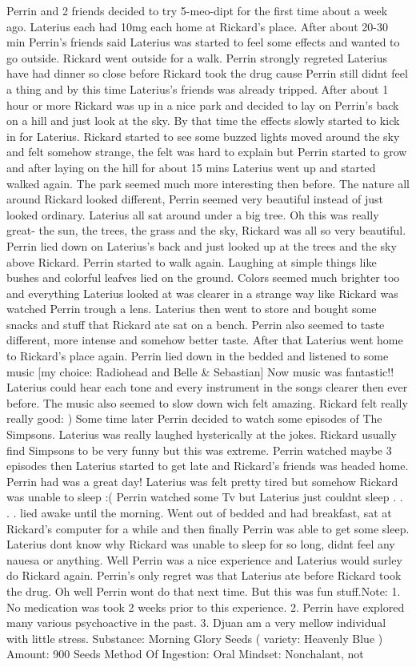 \documentclass[12pt]{book}
\begin{document}
Perrin and 2 friends decided to try 5-meo-dipt for the first time about a week ago. Laterius each had 10mg each home at Rickard's place. After about 20-30 min Perrin's friends said Laterius was started to feel some effects and wanted to go outside. Rickard went outside for a walk. Perrin strongly regreted Laterius have had dinner so close before Rickard took the drug cause Perrin still didnt feel a thing and by this time Laterius's friends was already tripped. After about 1 hour or more Rickard was up in a nice park and decided to lay on Perrin's back on a hill and just look at the sky. By that time the effects slowly started to kick in for Laterius. Rickard started to see some buzzed lights moved around the sky and felt somehow strange, the felt was hard to explain but Perrin started to grow and after laying on the hill for about 15 mins Laterius went up and started walked again. The park seemed much more interesting then before. The nature all around Rickard looked different, Perrin seemed very beautiful instead of just looked ordinary. Laterius all sat around under a big tree. Oh this was really great- the sun, the trees, the grass and the sky, Rickard was all so very beautiful. Perrin lied down on Laterius's back and just looked up at the trees and the sky above Rickard. Perrin started to walk again. Laughing at simple things like bushes and colorful leafves lied on the ground. Colors seemed much brighter too and everything Laterius looked at was clearer in a strange way like Rickard was watched Perrin trough a lens. Laterius then went to store and bought some snacks and stuff that Rickard ate sat on a bench. Perrin also seemed to taste different, more intense and somehow better taste. After that Laterius went home to Rickard's place again. Perrin lied down in the bedded and listened to some music [my choice: Radiohead and Belle \& Sebastian] Now music was fantastic!! Laterius could hear each tone and every instrument in the songs clearer then ever before. The music also seemed to slow down wich felt amazing. Rickard felt really really good: ) Some time later Perrin decided to watch some episodes of The Simpsons. Laterius was really laughed hysterically at the jokes. Rickard usually find Simpsons to be very funny but this was extreme. Perrin watched maybe 3 episodes then Laterius started to get late and Rickard's friends was headed home. Perrin had was a great day! Laterius was felt pretty tired but somehow Rickard was unable to sleep :( Perrin watched some Tv but Laterius just couldnt sleep . . .  . lied awake until the morning. Went out of bedded and had breakfast, sat at Rickard's computer for a while and then finally Perrin was able to get some sleep. Laterius dont know why Rickard was unable to sleep for so long, didnt feel any nauesa or anything. Well Perrin was a nice experience and Laterius would surley do Rickard again. Perrin's only regret was that Laterius ate before Rickard took the drug. Oh well Perrin wont do that next time. But this was fun stuff.Note: 1. No medication was took 2 weeks prior to this experience. 2. Perrin have explored many various psychoactive in the past. 3. Djuan am a very mellow individual with little stress. Substance: Morning Glory Seeds ( variety: Heavenly Blue ) Amount: 900 Seeds Method Of Ingestion: Oral Mindset: Nonchalant, not 
\end{document}
